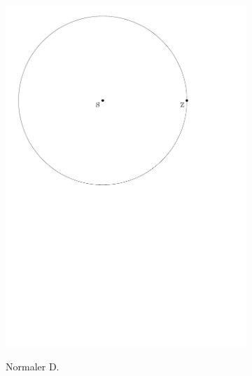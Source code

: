 \documentclass[12pt,a4paper]{article}
\begin{document}
\begin{figure}[h]
\centering
\begin{subfigure}{0.30\textwidth}
\centering
\includegraphics[width = \textwidth]{../media/normaldijkstra.pdf} \\
\caption{Normaler D.}
\label{fig:normalD}
\end{subfigure}
\begin{subfigure}{0.30\textwidth}
\centering

\end{subfigure}
\end{figure}
\end{document}
